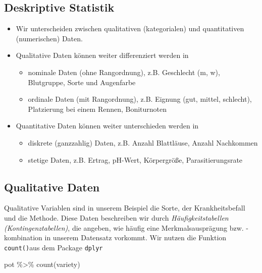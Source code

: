 \documentclass[
  letterpaper,
  DIV=11,
  numbers=noendperiod]{scrartcl}
\newenvironment{Shaded}{\begin{snugshade}}{\end{snugshade}}
\newcommand{\FunctionTok}[1]{\textcolor[rgb]{0.28,0.35,0.67}{#1}}
\newcommand{\NormalTok}[1]{\textcolor[rgb]{0.00,0.23,0.31}{#1}}
\newcommand{\SpecialCharTok}[1]{\textcolor[rgb]{0.37,0.37,0.37}{#1}}
\providecommand{\tightlist}{%
  \setlength{\itemsep}{0pt}\setlength{\parskip}{0pt}}\usepackage{longtable,booktabs,array}
\begin{document}
\hypertarget{deskriptive-statistik}{%
\subsection{Deskriptive Statistik}\label{deskriptive-statistik}}

\begin{itemize}
\tightlist
\item
  Wir unterscheiden zwischen qualitativen (kategorialen) und
  quantitativen (numerischen) Daten.
\item
  Qualitative Daten können weiter differenziert werden in

  \begin{itemize}
  \tightlist
  \item
    nominale Daten (ohne Rangordnung), z.B. Geschlecht (m, w),
    Blutgruppe, Sorte und Augenfarbe
  \item
    ordinale Daten (mit Rangordnung), z.B. Eignung (gut, mittel,
    schlecht), Platzierung bei einem Rennen, Boniturnoten
  \end{itemize}
\item
  Quantitative Daten können weiter unterschieden werden in

  \begin{itemize}
  \tightlist
  \item
    diskrete (ganzzahlig) Daten, z.B. Anzahl Blattläuse, Anzahl
    Nachkommen
  \item
    stetige Daten, z.B. Ertrag, pH-Wert, Körpergröße, Parasitierungsrate
  \end{itemize}
\end{itemize}

\hypertarget{qualitative-daten}{%
\subsection{Qualitative Daten}\label{qualitative-daten}}

Qualitative Variablen sind in unserem Beispiel die Sorte, der
Krankheitsbefall und die Methode. Diese Daten beschreiben wir durch
\emph{Häufigkeitstabellen (Kontingenztabellen)}, die angeben, wie häufig
eine Merkmalsausprägung bzw. -kombination in unserem Datensatz vorkommt.
Wir nutzen die Funktion \texttt{count()}aus dem Package \texttt{dplyr}

\begin{Shaded}
\begin{Highlighting}[]
\NormalTok{pot }\SpecialCharTok{\%\textgreater{}\%} \FunctionTok{count}\NormalTok{(variety)}
\end{Highlighting}
\end{Shaded}
\end{document}
